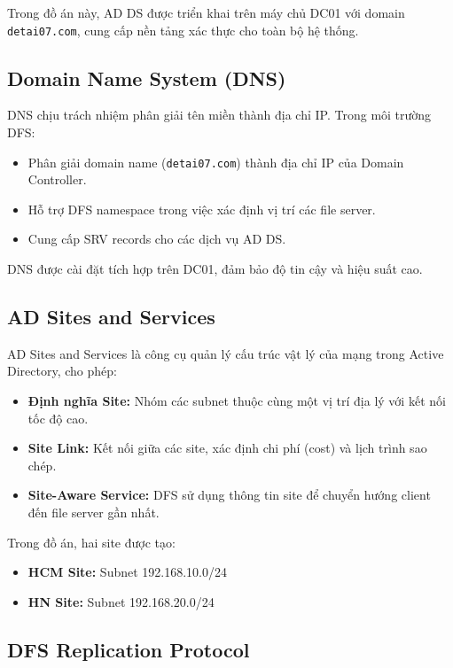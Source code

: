 Trong đồ án này, AD DS được triển khai trên máy chủ DC01 với domain \texttt{detai07.com}, cung cấp nền tảng xác thực cho toàn bộ hệ thống.

\subsection{Domain Name System (DNS)}

DNS chịu trách nhiệm phân giải tên miền thành địa chỉ IP. Trong môi trường DFS:

\begin{itemize}
    \item Phân giải domain name (\texttt{detai07.com}) thành địa chỉ IP của Domain Controller.
    \item Hỗ trợ DFS namespace trong việc xác định vị trí các file server.
    \item Cung cấp SRV records cho các dịch vụ AD DS.
\end{itemize}

DNS được cài đặt tích hợp trên DC01, đảm bảo độ tin cậy và hiệu suất cao.

\subsection{AD Sites and Services}

AD Sites and Services là công cụ quản lý cấu trúc vật lý của mạng trong Active Directory, cho phép:

\begin{itemize}
    \item \textbf{Định nghĩa Site:} Nhóm các subnet thuộc cùng một vị trí địa lý với kết nối tốc độ cao.
    \item \textbf{Site Link:} Kết nối giữa các site, xác định chi phí (cost) và lịch trình sao chép.
    \item \textbf{Site-Aware Service:} DFS sử dụng thông tin site để chuyển hướng client đến file server gần nhất.
\end{itemize}

Trong đồ án, hai site được tạo:
\begin{itemize}
    \item \textbf{HCM Site:} Subnet 192.168.10.0/24
    \item \textbf{HN Site:} Subnet 192.168.20.0/24
\end{itemize}

\subsection{DFS Replication Protocol}


